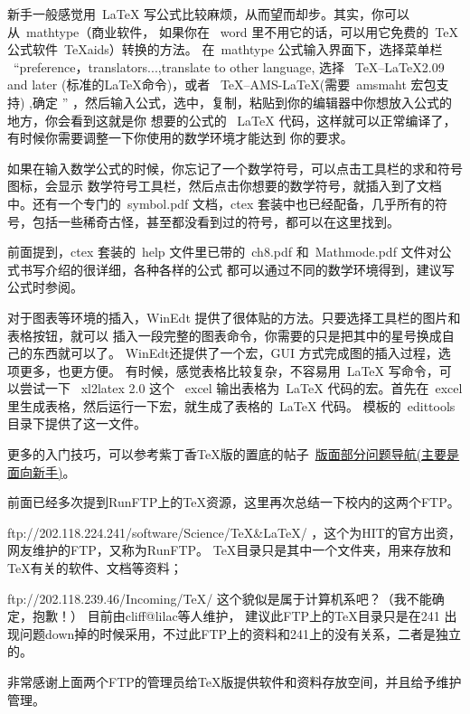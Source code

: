 
新手一般感觉用~LaTeX 写公式比较麻烦，从而望而却步。其实，你可以从~mathtype（商业软件，
如果你在~ word 里不用它的话，可以用它免费的~TeX 公式软件~TeXaids）转换的方法。
在~mathtype 公式输入界面下，选择菜单栏 ~``preference，translators...,translate to other language,
选择~ TeX--LaTeX2.09 and later (标准的LaTeX命令)，或者~ TeX--AMS-LaTeX(需要~amsmaht 宏包支持) ,确定 ''
，然后输入公式，选中，复制，粘贴到你的编辑器中你想放入公式的地方，你会看到这就是你
想要的公式的~ LaTeX  代码，这样就可以正常编译了，有时候你需要调整一下你使用的数学环境才能达到
你的要求。

如果在输入数学公式的时候，你忘记了一个数学符号，可以点击工具栏的求和符号图标，会显示
数学符号工具栏，然后点击你想要的数学符号，就插入到了文档中。还有一个专门的~symbol.pdf 文档，ctex
套装中也已经配备，几乎所有的符号，包括一些稀奇古怪，甚至都没看到过的符号，都可以在这里找到。

前面提到，ctex 套装的~help 文件里已带的~ch8.pdf 和~Mathmode.pdf 文件对公式书写介绍的很详细，各种各样的公式
都可以通过不同的数学环境得到，建议写公式时参阅。


对于图表等环境的插入，WinEdt 提供了很体贴的方法。只要选择工具栏的图片和表格按钮，就可以
插入一段完整的图表命令，你需要的只是把其中的星号换成自己的东西就可以了。
WinEdt还提供了一个宏，GUI 方式完成图的插入过程，选项更多，也更方便。
有时候，感觉表格比较复杂，不容易用~LaTeX 写命令，可以尝试一下 ~xl2latex 2.0 这个~ excel
输出表格为~LaTeX 代码的宏。首先在~excel 里生成表格，然后运行一下宏，就生成了表格的~LaTeX 代码。
模板的~edittools 目录下提供了这一文件。


更多的入门技巧，可以参考紫丁香TeX版的置底的帖子~\href{http://bbs.hit.edu.cn/bbscon.php?board=TeX&id=2038&ftype=11}{版面部分问题导航(主要是面向新手)}。

前面已经多次提到RunFTP上的TeX资源，这里再次总结一下校内的这两个FTP。
\begin{hitlist}
  \item ftp://202.118.224.241/software/Science/TeX\&LaTeX/  ，这个为HIT的官方出资，网友维护的FTP，又称为RunFTP。
  TeX目录只是其中一个文件夹，用来存放和TeX有关的软件、文档等资料；
  \item ftp://202.118.239.46/Incoming/TeX/  这个貌似是属于计算机系吧？（我不能确定，抱歉！） 目前由cliff@lilac等人维护，
建议此FTP上的TeX目录只是在241 出现问题down掉的时候采用，不过此FTP上的资料和241上的没有关系，二者是独立的。
\end{hitlist}

非常感谢上面两个FTP的管理员给TeX版提供软件和资料存放空间，并且给予维护管理。

